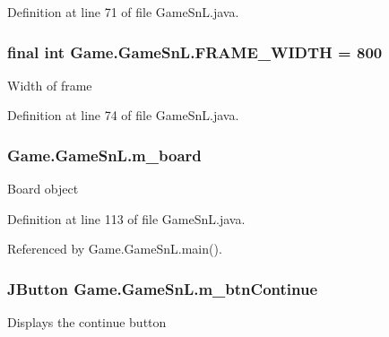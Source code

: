 Definition at line 71 of file Game\+Sn\+L.\+java.

\hypertarget{class_game_1_1_game_sn_l_afdca372266402cff76e7713cb7141ad6}{}
\subsubsection[{F\+R\+A\+M\+E\+\_\+\+W\+I\+D\+T\+H}]{\setlength{\rightskip}{0pt plus 5cm}final int Game.\+Game\+Sn\+L.\+F\+R\+A\+M\+E\+\_\+\+W\+I\+D\+T\+H = 800\hspace{0.3cm}{\ttfamily [private]}}\label{class_game_1_1_game_sn_l_afdca372266402cff76e7713cb7141ad6}
Width of frame 

Definition at line 74 of file Game\+Sn\+L.\+java.

\hypertarget{class_game_1_1_game_sn_l_a9cb06e53592cfc48ca485c25ab9c1e42}{}
\subsubsection[{m\+\_\+board}]{ Game.\+Game\+Sn\+L.\+m\+\_\+board\hspace{0.3cm}{\ttfamily [private]}}\label{class_game_1_1_game_sn_l_a9cb06e53592cfc48ca485c25ab9c1e42}
Board object 

Definition at line 113 of file Game\+Sn\+L.\+java.



Referenced by Game.\+Game\+Sn\+L.\+main().

\hypertarget{class_game_1_1_game_sn_l_a6e2e15971627fbc196ed207742a79e44}{}
\subsubsection[{m\+\_\+btn\+Continue}]{\setlength{\rightskip}{0pt plus 5cm}J\+Button Game.\+Game\+Sn\+L.\+m\+\_\+btn\+Continue\hspace{0.3cm}{\ttfamily [private]}}\label{class_game_1_1_game_sn_l_a6e2e15971627fbc196ed207742a79e44}
Displays the continue button 

